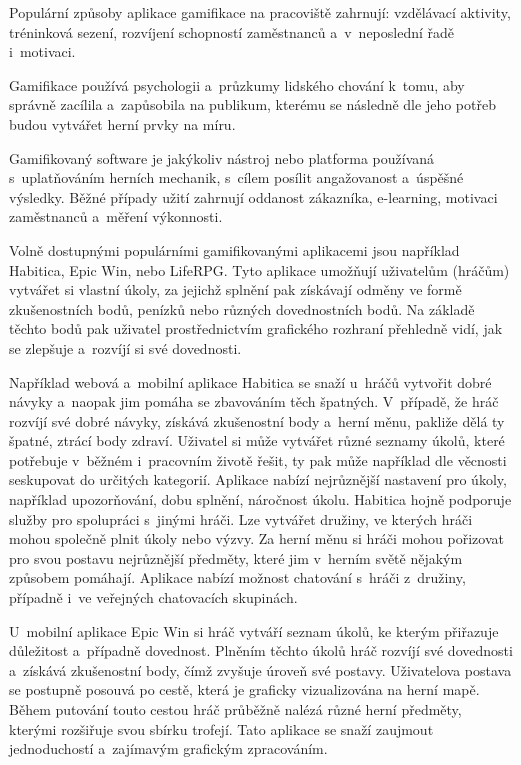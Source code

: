 \documentclass[twoside, 12pt]{article}
\begin{document}
\par

Populární způsoby aplikace gamifikace na pracoviště zahrnují: vzdělávací aktivity,
tréninková sezení, rozvíjení schopností zaměstnanců a~v~neposlední řadě i~motivaci.

Gamifikace používá psychologii a~průzkumy lidského chování k~tomu,
aby správně zacílila a~zapůsobila na publikum,
kterému se následně dle jeho potřeb budou vytvářet herní prvky na míru.


Gamifikovaný software je jakýkoliv nástroj nebo platforma používaná s~uplatňováním herních mechanik,
s~cílem posílit angažovanost a~úspěšné výsledky.
Běžné případy užití zahrnují oddanost zákazníka, e-learning, motivaci zaměstnanců a~měření výkonnosti.

\par

Volně dostupnými populárními gamifikovanými aplikacemi
jsou například Habitica, Epic Win, nebo LifeRPG.
Tyto aplikace umožňují uživatelům (hráčům) vytvářet si vlastní úkoly,
za jejichž splnění pak získávají odměny ve formě zkušenostních bodů,
penízků nebo různých dovednostních bodů.
Na základě těchto bodů pak uživatel prostřednictvím grafického rozhraní přehledně vidí,
jak se zlepšuje a~rozvíjí si své dovednosti.

\par

Například webová a~mobilní aplikace Habitica se snaží u~hráčů vytvořit dobré návyky
a~naopak jim pomáha se zbavováním těch špatných.
V~případě, že hráč rozvíjí své dobré návyky,
získává zkušenostní body a~herní měnu,
pakliže dělá ty špatné, ztrácí body zdraví.
Uživatel si může vytvářet různé seznamy úkolů,
které potřebuje v~běžném i~pracovním životě řešit,
ty pak může například dle věcnosti seskupovat do určitých kategorií.
Aplikace nabízí nejrůznější nastavení pro úkoly, například upozorňování, dobu splnění, náročnost úkolu.
Habitica hojně podporuje služby pro spolupráci s~jinými hráči. Lze vytvářet družiny,
ve kterých hráči mohou společně plnit úkoly nebo výzvy.
Za herní měnu si hráči mohou pořizovat pro svou postavu nejrůznější předměty,
které jim v~herním světě nějakým způsobem pomáhají.
Aplikace nabízí možnost chatování s~hráči z~družiny, případně i~ve veřejných chatovacích skupinách.

\par

U~mobilní aplikace Epic Win si hráč vytváří seznam úkolů,
ke kterým přiřazuje důležitost a~případně dovednost.
Plněním těchto úkolů hráč rozvíjí své dovednosti
a~získává zkušenostní body,
čímž zvyšuje úroveň své postavy.
Uživatelova postava se postupně posouvá po cestě,
která je graficky vizualizována na herní mapě.
Během putování touto cestou hráč průběžně nalézá
různé herní předměty, kterými rozšiřuje svou sbírku trofejí.
Tato aplikace se snaží zaujmout jednoduchostí a~zajímavým grafickým zpracováním.
\end{document}

